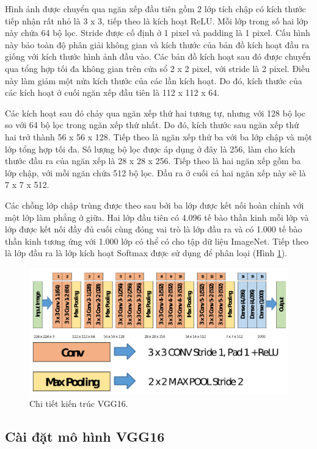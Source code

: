 Hình ảnh được chuyển qua ngăn xếp đầu tiên gồm 2 lớp tích chập có kích thước tiếp nhận rất nhỏ là 3 x 3, tiếp theo là kích hoạt ReLU. Mỗi lớp trong số hai lớp này chứa 64 bộ lọc. Stride được cố định ở 1 pixel và padding là 1 pixel. Cấu hình này bảo toàn độ phân giải không gian và kích thước của bản đồ kích hoạt đầu ra giống với kích thước hình ảnh đầu vào. Các bản đồ kích hoạt sau đó được chuyển qua tổng hợp tối đa không gian trên cửa sổ 2 x 2 pixel, với stride là 2 pixel. Điều này làm giảm một nửa kích thước của các lần kích hoạt. Do đó, kích thước của các kích hoạt ở cuối ngăn xếp đầu tiên là 112 x 112 x 64.

Các kích hoạt sau đó chảy qua ngăn xếp thứ hai tương tự, nhưng với 128 bộ lọc so với 64 bộ lọc trong ngăn xếp thứ nhất. Do đó, kích thước sau ngăn xếp thứ hai trở thành 56 x 56 x 128. Tiếp theo là ngăn xếp thứ ba với ba lớp chập và một lớp tổng hợp tối đa. Số lượng bộ lọc được áp dụng ở đây là 256, làm cho kích thước đầu ra của ngăn xếp là 28 x 28 x 256. Tiếp theo là hai ngăn xếp gồm ba lớp chập, với mỗi ngăn chứa 512 bộ lọc. Đầu ra ở cuối cả hai ngăn xếp này sẽ là 7 x 7 x 512.

Các chồng lớp chập trùng được theo sau bởi ba lớp được kết nối hoàn chỉnh với một lớp làm phẳng ở giữa. Hai lớp đầu tiên có 4.096 tế bào thần kinh mỗi lớp và lớp được kết nối đầy đủ cuối cùng đóng vai trò là lớp đầu ra và có 1.000 tế bào thần kinh tương ứng với 1.000 lớp có thể có cho tập dữ liệu ImageNet. Tiếp theo là lớp đầu ra là lớp kích hoạt Softmax được sử dụng để phân loại (Hình \ref{fig:vgg16_imagenet_detail}).

\begin{figure}[H]
	\centering
	\includegraphics[width=1\linewidth]{images/vgg16_imagenet_detail}
	\caption{Chi tiết kiến trúc VGG16.}
	\label{fig:vgg16_imagenet_detail}
\end{figure}

\subsection{Cài đặt mô hình VGG16}


